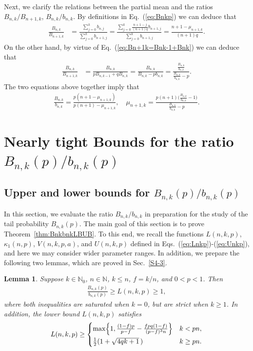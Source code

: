 \documentclass[aop]{imsart}
\theoremstyle{plain}
\newtheorem{lemma}[theorem]{Lemma}
\theoremstyle{remark}
\newcommand{\bbN}{\mathbb{N}}
\newcommand{\1}{\operatorname{\uppercase\expandafter{\romannumeral1}}}
\newcommand{\2}{\operatorname{\uppercase\expandafter{\romannumeral2}}}
\newcommand{\3}{\operatorname{\uppercase\expandafter{\romannumeral3}}}
\newcommand{\4}{\operatorname{\uppercase\expandafter{\romannumeral4}}}
\newcommand{\5}{\operatorname{\uppercase\expandafter{\romannumeral5}}}
\newcommand{\6}{\operatorname{\uppercase\expandafter{\romannumeral6}}}
\newcommand{\7}{\operatorname{\uppercase\expandafter{\romannumeral7}}}
\newcommand{\8}{\operatorname{\uppercase\expandafter{\romannumeral8}}}
\newcommand{\9}{\operatorname{\uppercase\expandafter{\romannumeral9}}}
\def\eqref#1{\textup{(\ref{#1})}}
\newcommand{\eref}[1]{Eq.~\textup{(\ref{#1})}}
\newcommand{\thref}[1]{Theorem~\ref{#1}}
\newcommand{\sref}[1]{Sec.~\ref{#1}}
\begin{document}
Next, we clarify the relations between the partial mean and the ratios $B_{n,k}/B_{n+1,k}$,  $B_{n,k}/b_{n,k}$. By definitions  in \eref{eq:Bnkp} we can deduce that
\begin{align}
\frac{B_{n,k}}{B_{n+1,k}}&=\frac{\sum_{j=0}^kb_{n,j}}{\sum_{j=0}^kb_{n+1,j}}=\frac{\sum_{j=0}^k\frac{n+1-j}{(n+1)q}b_{n+1,j}}{\sum_{j=0}^kb_{n+1,j}}=\frac{n+1-\mu_{n+1,k}}{(n+1)q}. \label{eq:BnkBn+1kMunk}
\end{align}	
On the other hand, by virtue of \eref{eq:Bn+1k=Bnk-1+Bnk} we can deduce that 
\begin{align}
\frac{B_{n,k}}{B_{n+1,k}}&=\frac{B_{n,k}}{p B_{n,k-1}+q B_{n,k}}=\frac{B_{n,k}}{B_{n,k}-pb_{n,k}}=\frac{\frac{B_{n,k}}{b_{n,k}}}{\frac{B_{n,k}}{b_{n,k}}-p}.
\end{align}
The two equations above together imply that 
\begin{align}
\frac{B_{n,k}}{b_{n,k}}=\frac{p(n+1-\mu_{n+1,k})}{p(n+1)-\mu_{n+1,k}},\quad\mu_{n+1,k}=\frac{p(n+1)\bigl(\frac{B_{n,k}}{b_{n,k}}-1\bigr)}{\frac{B_{n,k}}{b_{n,k}}-p}.\label{eq:BnkbnkMunk}
\end{align}


\section{Nearly tight Bounds for the ratio $B_{n,k}(p)/b_{n,k}(p)$}\label{sec:Bbratio}

\subsection{Upper and lower bounds for $B_{n,k}(p)/b_{n,k}(p)$}\label{sec:MainBounds}
In this section,
we evaluate the ratio $B_{n,k}/b_{n,k}$ in preparation for the study of the tail probability $B_{n,k}(p)$.
The main goal  of this section is to prove \thref{thm:BnkbnkLBUB}.
To this end, we recall the functions $L(n,k,p)$,  $\kappa_1(n,p)$, $V(n,k,p,a) $,
and $U(n,k,p)$ defined in Eqs.~\eqref{eq:Lnkp}-\eqref{eq:Unkp}, and here we may consider wider parameter ranges. In addition, we prepare the following two lemmas,
which are proved in  \sref{S4-3}.



\begin{lemma}\label{lem:BnkbnkRatioLB}
	Suppose  $k\in \bbN_0$, $n\in \bbN$, $k\leq n$, $f=k/n$, and $0<p<1$.  Then 
	\begin{gather}
	\frac{B_{n,k}(p)}{b_{n,k}(p)}\geq L(n,k,p)\geq 1,
	\label{eq:BnkbnkRatioLB}
\end{gather}
where both inequalities are saturated when $k=0$, but are strict when $k\geq 1$.  In addition, the lower bound 
$L(n,k,p)$ satisfies
\begin{gather}	
 L(n,k,p)\geq
\begin{cases}
\max\Bigl\{1,\frac{(1-f)p}{p-f}-\frac{fpq(1-f) }{(p-f)^3n} \Bigr\} & k<pn, \\[1ex]
\frac{1}{2}(1+\sqrt{4q k+1}\,) & k\geq pn. \label{eq:BnkbnkRatioLB2}
\end{cases}
\end{gather}
\end{lemma}
\end{document}
